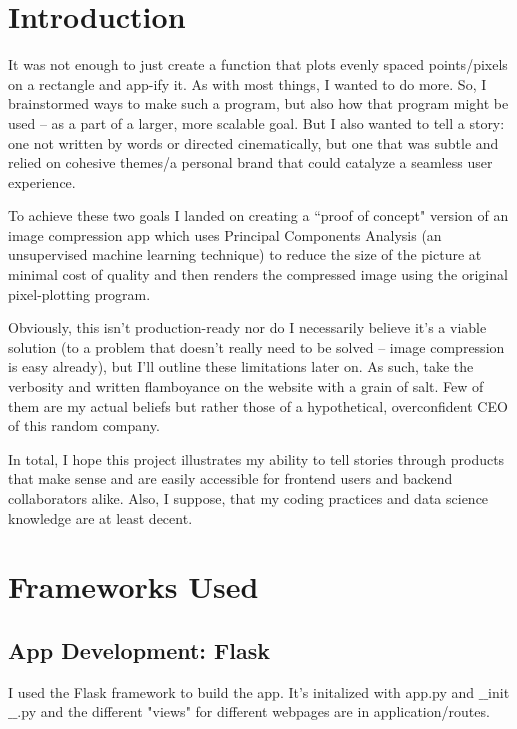 \documentclass[10pt]{article}
\begin{document}
\begin{multicols*}{2}

\section{Introduction}
 
It was not enough to just create a function that plots evenly spaced points/pixels on a rectangle and app-ify it. As with most things, I wanted to do more. So, I brainstormed ways to make such a program, but also how that program might be used -- as a part of a larger, more scalable goal. But I also wanted to tell a story: one not written by words or directed cinematically, but one that was subtle and relied on cohesive themes/a personal brand that could catalyze a seamless user experience.

To achieve these two goals I landed on creating a ``proof of concept" version of an image compression app which uses Principal Components Analysis (an unsupervised machine learning technique) to reduce the size of the picture at minimal cost of quality and then renders the compressed image using the original pixel-plotting program.

Obviously, this isn't production-ready nor do I necessarily believe it's a viable solution (to a problem that doesn't really need to be solved -- image compression is easy already), but I'll outline these limitations later on. As such, take the verbosity and written flamboyance on the website with a grain of salt. Few of them are my actual beliefs but rather those of a hypothetical, overconfident CEO of this random company. 

In total, I hope this project illustrates my ability to tell stories through products that make sense and are easily accessible for frontend users and backend collaborators alike. Also, I suppose, that my coding practices and data science knowledge are at least decent. \vspace{-2ex}

\section{Frameworks Used}

\subsection{App Development: Flask}

I used the Flask framework to build the app. It's initalized with app.py and $\_\_$init$\_\_$.py and the different "views" for different webpages are in application/routes.


\end{multicols*}
\end{document}
